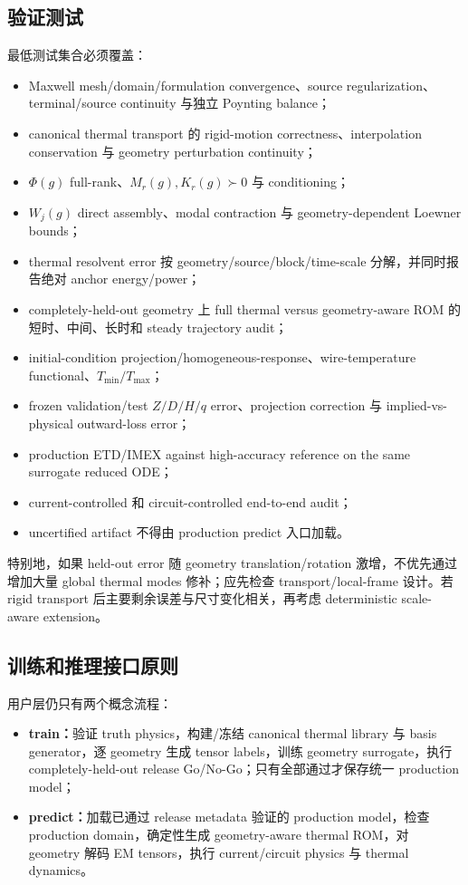 \subsection{验证测试}
最低测试集合必须覆盖：
\begin{itemize}
  \item Maxwell mesh/domain/formulation convergence、source regularization、terminal/source continuity 与独立 Poynting balance；
  \item canonical thermal transport 的 rigid-motion correctness、interpolation conservation 与 geometry perturbation continuity；
  \item $\Phi(g)$ full-rank、$M_r(g),K_r(g)\succ0$ 与 conditioning；
  \item $W_j(g)$ direct assembly、modal contraction 与 geometry-dependent Loewner bounds；
  \item thermal resolvent error 按 geometry/source/block/time-scale 分解，并同时报告绝对 anchor energy/power；
  \item completely-held-out geometry 上 full thermal versus geometry-aware ROM 的短时、中间、长时和 steady trajectory audit；
  \item initial-condition projection/homogeneous-response、wire-temperature functional、$T_{\min}/T_{\max}$；
  \item frozen validation/test $Z/D/H/q$ error、projection correction 与 implied-vs-physical outward-loss error；
  \item production ETD/IMEX against high-accuracy reference on the same surrogate reduced ODE；
  \item current-controlled 和 circuit-controlled end-to-end audit；
  \item uncertified artifact 不得由 production predict 入口加载。
\end{itemize}

特别地，如果 held-out error 随 geometry translation/rotation 激增，不优先通过增加大量 global thermal modes 修补；应先检查 transport/local-frame 设计。若 rigid transport 后主要剩余误差与尺寸变化相关，再考虑 deterministic scale-aware extension。

\subsection{训练和推理接口原则}
用户层仍只有两个概念流程：
\begin{itemize}
  \item \textbf{train：}验证 truth physics，构建/冻结 canonical thermal library 与 basis generator，逐 geometry 生成 tensor labels，训练 geometry surrogate，执行 completely-held-out release Go/No-Go；只有全部通过才保存统一 production model；
  \item \textbf{predict：}加载已通过 release metadata 验证的 production model，检查 production domain，确定性生成 geometry-aware thermal ROM，对 geometry 解码 EM tensors，执行 current/circuit physics 与 thermal dynamics。
\end{itemize}

